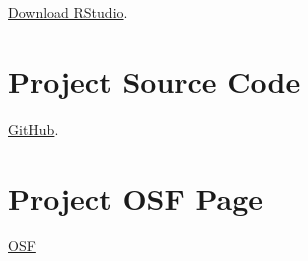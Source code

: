 \documentclass[
]{book}
\begin{document}
\href{https://rstudio.com/products/rstudio/download/\#download}{Download RStudio}.

\hypertarget{project-source-code}{%
\section*{Project Source Code}\label{project-source-code}}

\href{https://github.com/Peter-Kedron/COVID-19-Digital-Contact-Tracing-and-Geospatial-Technologies-and-Privacy}{GitHub}.

\hypertarget{project-osf-page}{%
\section*{Project OSF Page}\label{project-osf-page}}

\href{https://osf.io/kpvbq/}{OSF}

  
\end{document}
